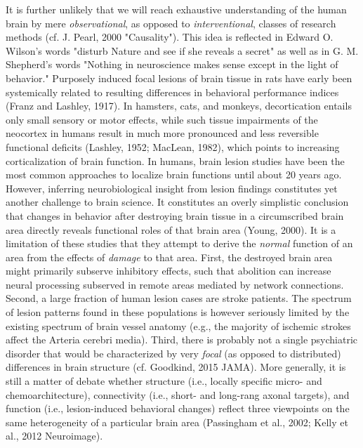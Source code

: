 \documentclass[authoryear,review,3p]{elsarticle}
\begin{document}
It is further unlikely that we
will reach exhaustive understanding of
the human brain by mere
\textit{observational}, as opposed to \textit{interventional},
classes of research methods
(cf. J. Pearl, 2000 "Causality").
This idea is reflected in
Edward O. Wilson's words
"disturb Nature and see if she reveals a secret"
as well as in
G. M. Shepherd's words
"Nothing in neuroscience makes sense except in the light of behavior."
%
Purposely induced focal lesions of brain tissue in rats have early
been systemically related to resulting differences in
behavioral performance indices
(Franz and Lashley, 1917).
In hamsters, cats, and monkeys,
decortication entails only small sensory or motor effects,
while such tissue impairments of the neocortex in humans
result in much more pronounced and less reversible 
functional deficits
(Lashley, 1952; MacLean, 1982),
which points to increasing corticalization of brain function.
In humans, brain lesion studies have been
the most common approaches
to localize brain functions
until about 20 years ago.
%
However, inferring neurobiological insight from lesion findings constitutes
yet another challenge to brain science.
It constitutes an overly simplistic conclusion that
changes in behavior after destroying brain tissue in a
circumscribed brain area directly reveals functional roles
of that brain area (Young, 2000).
It is a limitation of these studies that
they attempt to derive the \textit{normal} function of
an area from the effects of \textit{damage} to that area.
%
First,
the destroyed brain area might  primarily subserve inhibitory effects,
such that abolition can increase neural processing subserved in remote areas
mediated by network connections.
Second,
a large fraction of human lesion cases are stroke patients.
The spectrum of lesion patterns found in these populations
is however seriously limited by the existing spectrum of
brain vessel anatomy
(e.g., the majority of ischemic strokes affect the Arteria cerebri media).
Third,
there is probably not a single psychiatric disorder that would be
characterized by very \textit{focal} (as opposed to distributed)
differences in brain structure
(cf. Goodkind, 2015 JAMA).
%
More generally, it is still a matter of debate whether
structure (i.e., locally specific micro- and chemoarchitecture),
connectivity (i.e., short- and long-rang axonal targets),
and function (i.e., lesion-induced behavioral changes)
reflect three  viewpoints on the same heterogeneity of
a particular brain area
(Passingham et al., 2002; Kelly et al., 2012 Neuroimage).
\end{document}
